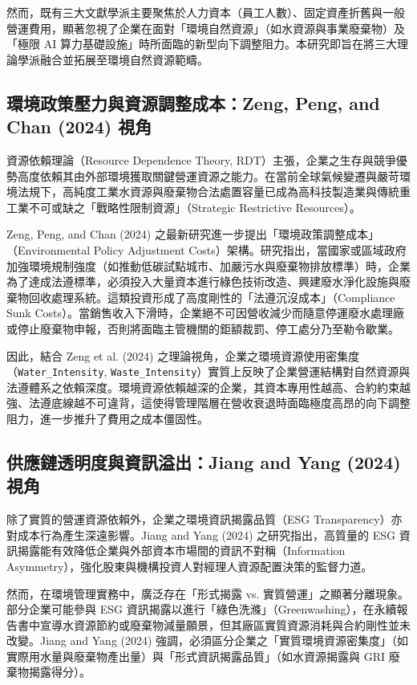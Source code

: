 \documentclass[12pt,a4paper]{article}
\begin{document}
然而，既有三大文獻學派主要聚焦於人力資本（員工人數）、固定資產折舊與一般營運費用，顯著忽視了企業在面對「環境自然資源」（如水資源與事業廢棄物）及「極限 AI 算力基礎設施」時所面臨的新型向下調整阻力。本研究即旨在將三大理論學派融合並拓展至環境自然資源範疇。

\subsection{環境政策壓力與資源調整成本：Zeng, Peng, and Chan (2024) 視角}

資源依賴理論（Resource Dependence Theory, RDT）主張，企業之生存與競爭優勢高度依賴其由外部環境獲取關鍵營運資源之能力。在當前全球氣候變遷與嚴苛環境法規下，高純度工業水資源與廢棄物合法處置容量已成為高科技製造業與傳統重工業不可或缺之「戰略性限制資源」（Strategic Restrictive Resources）。

Zeng, Peng, and Chan (2024) 之最新研究進一步提出「環境政策調整成本」（Environmental Policy Adjustment Costs）架構。研究指出，當國家或區域政府加強環境規制強度（如推動低碳試點城市、加嚴污水與廢棄物排放標準）時，企業為了達成法遵標準，必須投入大量資本進行綠色技術改造、興建廢水淨化設施與廢棄物回收處理系統。這類投資形成了高度剛性的「法遵沉沒成本」（Compliance Sunk Costs）。當銷售收入下滑時，企業絕不可因營收減少而隨意停運廢水處理廠或停止廢棄物申報，否則將面臨主管機關的鉅額裁罰、停工處分乃至勒令歇業。

因此，結合 Zeng et al. (2024) 之理論視角，企業之環境資源使用密集度（\texttt{Water\_Intensity}, \texttt{Waste\_Intensity}）實質上反映了企業營運結構對自然資源與法遵體系之依賴深度。環境資源依賴越深的企業，其資本專用性越高、合約約束越強、法遵底線越不可違背，這使得管理階層在營收衰退時面臨極度高昂的向下調整阻力，進一步推升了費用之成本僵固性。

\subsection{供應鏈透明度與資訊溢出：Jiang and Yang (2024) 視角}

除了實質的營運資源依賴外，企業之環境資訊揭露品質（ESG Transparency）亦對成本行為產生深遠影響。Jiang and Yang (2024) 之研究指出，高質量的 ESG 資訊揭露能有效降低企業與外部資本市場間的資訊不對稱（Information Asymmetry），強化股東與機構投資人對經理人資源配置決策的監督力道。

然而，在環境管理實務中，廣泛存在「形式揭露 vs. 實質營運」之顯著分離現象。部分企業可能參與 ESG 資訊揭露以進行「綠色洗滌」（Greenwashing），在永續報告書中宣導水資源節約或廢棄物減量願景，但其廠區實質資源消耗與合約剛性並未改變。Jiang and Yang (2024) 強調，必須區分企業之「實質環境資源密集度」（如實際用水量與廢棄物產出量）與「形式資訊揭露品質」（如水資源揭露與 GRI 廢棄物揭露得分）。
\end{document}

